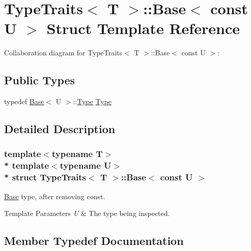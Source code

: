 \hypertarget{structTypeTraits_1_1Base_3_01const_01U_01_4}{}\section{Type\+Traits$<$ T $>$\+:\+:Base$<$ const U $>$ Struct Template Reference}
\label{structTypeTraits_1_1Base_3_01const_01U_01_4}


Collaboration diagram for Type\+Traits$<$ T $>$\+:\+:Base$<$ const U $>$\+:
\subsection*{Public Types}
\begin{DoxyCompactItemize}
\item 
typedef \hyperlink{structTypeTraits_1_1Base}{Base}$<$ U $>$\+::\hyperlink{structTypeTraits_1_1Base_3_01const_01U_01_4_a815dddf4b225074ee2895fd628447bd9}{Type} \hyperlink{structTypeTraits_1_1Base_3_01const_01U_01_4_a815dddf4b225074ee2895fd628447bd9}{Type}
\end{DoxyCompactItemize}


\subsection{Detailed Description}
\subsubsection*{template$<$typename T$>$\\*
template$<$typename U$>$\\*
struct Type\+Traits$<$ T $>$\+::\+Base$<$ const U $>$}

\hyperlink{structTypeTraits_1_1Base}{Base} type, after removing {\ttfamily const}. 
\begin{DoxyTemplParams}{Template Parameters}
{\em U} & The type being inspected. \\
\hline
\end{DoxyTemplParams}


\subsection{Member Typedef Documentation}
